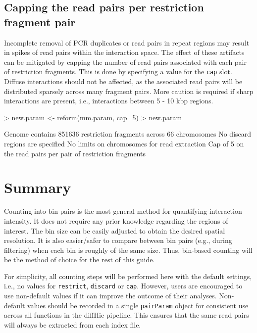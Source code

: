 \documentclass[12pt]{report}
\renewenvironment{Schunk}{\vspace{0pt}}{\vspace{0pt}}
\newcommand{\pkgname}{diffHic}
\newcommand{\code}[1]{{\small\texttt{#1}}}
\begin{document}
\subsection{Capping the read pairs per restriction fragment pair}
Incomplete removal of PCR duplicates or read pairs in repeat regions may result in spikes of read pairs within the interaction space.
The effect of these artifacts can be mitigated by capping the number of read pairs associated with each pair of restriction fragments.
This is done by specifying a value for the \code{cap} slot.
Diffuse interactions should not be affected, as the associated read pairs will be distributed sparsely across many fragment pairs.
More caution is required if sharp interactions are present, i.e., interactions between 5 - 10 kbp regions.

\begin{Schunk}
\begin{Sinput}
> new.param <- reform(mm.param, cap=5)
> new.param
\end{Sinput}
\begin{Soutput}
Genome contains 851636 restriction fragments across 66 chromosomes
No discard regions are specified
No limits on chromosomes for read extraction
Cap of 5 on the read pairs per pair of restriction fragments
\end{Soutput}
\end{Schunk}

\section{Summary}
Counting into bin pairs is the most general method for quantifying interaction intensity.
It does not require any prior knowledge regarding the regions of interest.
The bin size can be easily adjusted to obtain the desired spatial resolution.
It is also easier/safer to compare between bin pairs (e.g., during filtering) when each bin is roughly of the same size.
Thus, bin-based counting will be the method of choice for the rest of this guide.

For simplicity, all counting steps will be performed here with the default settings, i.e., no values for \code{restrict}, \code{discard} or \code{cap}.
However, users are encouraged to use non-default values if it can improve the outcome of their analyses.
Non-default values should be recorded in a single \code{pairParam} object for consistent use across all functions in the \pkgname{} pipeline.
This ensures that the same read pairs will always be extracted from each index file.
\end{document}
